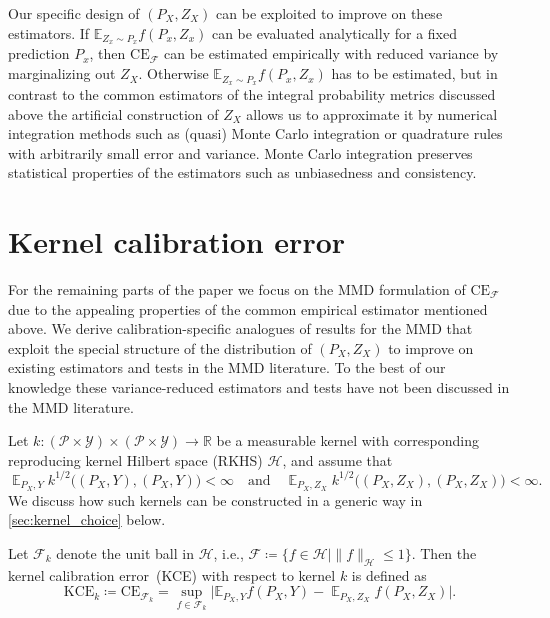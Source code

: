 \documentclass{article}
\DeclareMathOperator{\Exp}{\mathbb{E}}
\begin{document}
Our specific design of $(P_X, Z_X)$ can be exploited to improve
on these estimators. If $\mathbb{E}_{Z_x \sim P_x} f(P_x, Z_x)$
can be evaluated analytically for a fixed prediction $P_x$, then
$\mathrm{CE}_{\mathcal{F}}$ can be estimated empirically with reduced
variance by marginalizing out $Z_X$. Otherwise
$\mathbb{E}_{Z_x \sim P_x} f(P_x, Z_x)$ has to be estimated, but in
contrast to the common estimators of the integral probability metrics
discussed above 
the artificial construction of $Z_X$ allows us to
approximate it by numerical integration methods such as (quasi) Monte
Carlo integration or quadrature rules with arbitrarily small error and
variance. Monte Carlo integration preserves statistical properties of
the estimators such as unbiasedness and consistency.

\section{Kernel calibration error}
\label{sec:kce}

For the remaining parts of the paper we focus on the MMD formulation of
$\mathrm{CE}_{\mathcal{F}}$ due to the appealing properties of the common
empirical estimator mentioned above. We derive calibration-specific
analogues of results for the MMD that exploit the special structure of the
distribution of $(P_X, Z_X)$ to improve on existing estimators and tests
in the MMD literature. To the best of our knowledge these variance-reduced
estimators and tests have not been discussed in the MMD literature.

Let $k \colon (\mathcal{P} \times \mathcal{Y}) \times (\mathcal{P} \times \mathcal{Y}) \to \mathbb{R}$
be a measurable kernel with corresponding reproducing kernel Hilbert space (RKHS)
$\mathcal{H}$, and assume
that
\begin{equation*}
\Exp_{P_X,Y} k^{1/2}\big((P_X, Y), (P_X, Y)\big) < \infty
\quad \text{and} \quad
\Exp_{P_X,Z_X} k^{1/2}\big((P_X, Z_X), (P_X, Z_X)\big) < \infty.
\end{equation*}
We discuss how such kernels can be constructed in a generic way in \cref{sec:kernel_choice}
below.

\begin{definition}\label{def:kce}
Let $\mathcal{F}_k$ denote the unit ball in $\mathcal{H}$, i.e.,
$\mathcal{F} \coloneqq \{f \in \mathcal{H} | \|f\|_{\mathcal{H}} \leq 1 \}$.
Then the kernel calibration error~(KCE) with respect to kernel $k$ is
defined as
\begin{equation*}
    \mathrm{KCE}_k \coloneqq \mathrm{CE}_{\mathcal{F}_k} = \sup_{f \in \mathcal{F}_k} \big| \mathbb{E}_{P_X, Y}{f(P_X, Y)} - \Exp_{P_X, Z_X} f(P_X, Z_X) \big|.
\end{equation*}
\end{definition}
\end{document}
